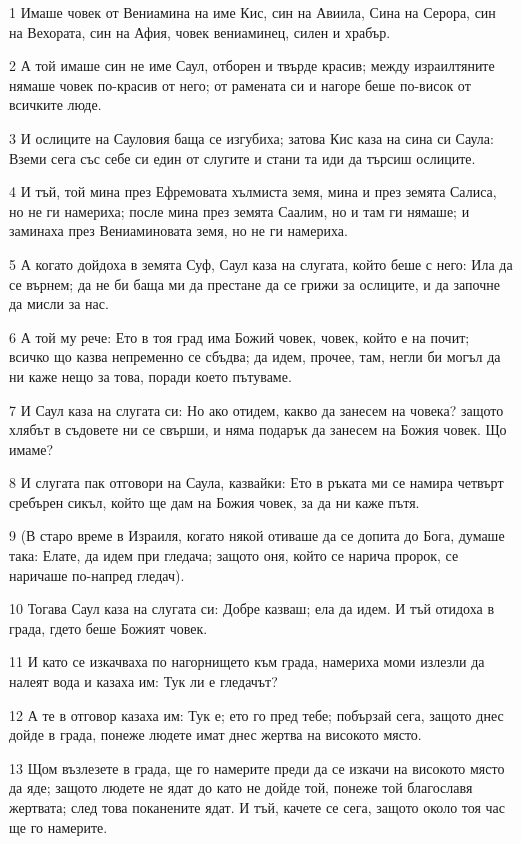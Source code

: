 \par 1 Имаше човек от Вениамина на име Кис, син на Авиила, Сина на Серора, син на Вехората, син на Афия, човек вениаминец, силен и храбър.
\par 2 А той имаше син не име Саул, отборен и твърде красив; между израилтяните нямаше човек по-красив от него; от рамената си и нагоре беше по-висок от всичките люде.
\par 3 И ослиците на Сауловия баща се изгубиха; затова Кис каза на сина си Саула: Вземи сега със себе си един от слугите и стани та иди да търсиш ослиците.
\par 4 И тъй, той мина през Ефремовата хълмиста земя, мина и през земята Салиса, но не ги намериха; после мина през земята Саалим, но и там ги нямаше; и заминаха през Вениаминовата земя, но не ги намериха.
\par 5 А когато дойдоха в земята Суф, Саул каза на слугата, който беше с него: Ила да се върнем; да не би баща ми да престане да се грижи за ослиците, и да започне да мисли за нас.
\par 6 А той му рече: Ето в тоя град има Божий човек, човек, който е на почит; всичко що казва непременно се сбъдва; да идем, прочее, там, негли би могъл да ни каже нещо за това, поради което пътуваме.
\par 7 И Саул каза на слугата си: Но ако отидем, какво да занесем на човека? защото хлябът в съдовете ни се свърши, и няма подарък да занесем на Божия човек. Що имаме?
\par 8 И слугата пак отговори на Саула, казвайки: Ето в ръката ми се намира четвърт сребърен сикъл, който ще дам на Божия човек, за да ни каже пътя.
\par 9 (В старо време в Израиля, когато някой отиваше да се допита до Бога, думаше така: Елате, да идем при гледача; защото оня, който се нарича пророк, се наричаше по-напред гледач).
\par 10 Тогава Саул каза на слугата си: Добре казваш; ела да идем. И тъй отидоха в града, гдето беше Божият човек.
\par 11 И като се изкачваха по нагорнището към града, намериха моми излезли да налеят вода и казаха им: Тук ли е гледачът?
\par 12 А те в отговор казаха им: Тук е; ето го пред тебе; побързай сега, защото днес дойде в града, понеже людете имат днес жертва на високото място.
\par 13 Щом възлезете в града, ще го намерите преди да се изкачи на високото място да яде; защото людете не ядат до като не дойде той, понеже той благославя жертвата; след това поканените ядат. И тъй, качете се сега, защото около тоя час ще го намерите.
